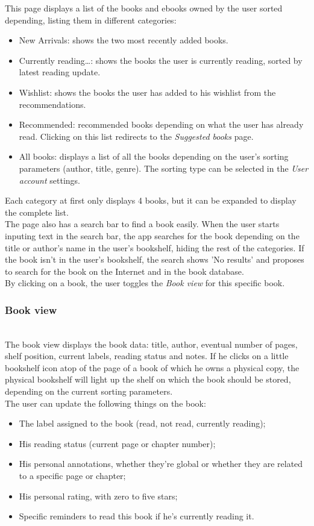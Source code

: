 \documentclass[conference]{IEEEtran}
\begin{document}
This page displays a list of the books and ebooks owned by the user sorted depending, listing them in different categories:
\begin{itemize}
	\item New Arrivals: shows the two most recently added books.
	\item Currently reading…: shows the books the user is currently reading, sorted by latest reading update.
	\item Wishlist: shows the books the user has added to his wishlist from the recommendations.
	\item Recommended: recommended books depending on what the user has already read. Clicking on this list redirects to the \textit{Suggested books} page.
	\item All books: displays a list of all the books depending on the user's sorting parameters (author, title, genre). The sorting type can be selected in the \textit{User account} settings.
\end{itemize}
Each category at first only displays 4 books, but it can be expanded to display the complete list.\\
The page also has a search bar to find a book easily. When the user starts inputing text in the search bar, the app searches for the book depending on the title or author's name in the user's bookshelf, hiding the rest of the categories. If the book isn't in the user's bookshelf, the search shows 'No results' and proposes to search for the book on the Internet and in the book database.\\
By clicking on a book, the user toggles the \textit{Book view} for this specific book.\\


\subsubsection{Book view}\hfill\\

The book view displays the book data: title, author, eventual number of pages, shelf position, current labels, reading status and notes. If he clicks on a little bookshelf icon atop of the page of a book of which he owns a physical copy, the physical bookshelf will light up the shelf on which the book should be stored, depending on the current sorting parameters.\\
The user can update the following things on the book:\\
\begin{itemize}
	\item The label assigned to the book (read, not read, currently reading);
	\item His reading status (current page or chapter number);
	\item His personal annotations, whether they're global or whether they are related to a specific page or chapter;
	\item His personal rating, with zero to five stars;
	\item Specific reminders to read this book if he's currently reading it.
\end{itemize}
\end{document}
